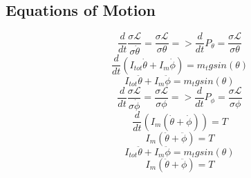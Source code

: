 \documentclass[12pt]{article}
\begin{document}
		\subsection{Equations of Motion}
			\begin{equation}
				\frac{d}{dt}\frac{\sigma\mathcal{L}}{\sigma\dot\theta} = \frac{\sigma\mathcal{L}}{\sigma\theta} => \frac{d}{dt}P_\theta = \frac{\sigma\mathcal{L}}{\sigma\theta}
			\end{equation}
			\begin{equation}
				\frac{d}{dt}(I_{tot}\dot\theta + I_m\dot\phi) = m_tgsin(\theta)
			\end{equation}
			\begin{equation}
				I_{tot}\ddot\theta + I_m\ddot\phi = m_tgsin(\theta)
			\end{equation}
			\begin{equation}
				\frac{d}{dt}\frac{\sigma\mathcal{L}}{\sigma\dot\phi} = \frac{\sigma\mathcal{L}}{\sigma\phi} => \frac{d}{dt}P_\phi = \frac{\sigma\mathcal{L}}{\sigma\phi}
			\end{equation}
			\begin{equation}
				\frac{d}{dt}(I_m(\dot\theta + \dot\phi)) = T
			\end{equation}
			\begin{equation}
				I_m(\ddot\theta + \ddot\phi) = T
			\end{equation}
			\begin{equation}
				\boxed{I_{tot}\ddot\theta + I_m\ddot\phi = m_tgsin(\theta)}
			\end{equation}
			\begin{equation}
				\boxed{I_m(\ddot\theta + \ddot\phi) = T}
			\end{equation}
	
\end{document}
